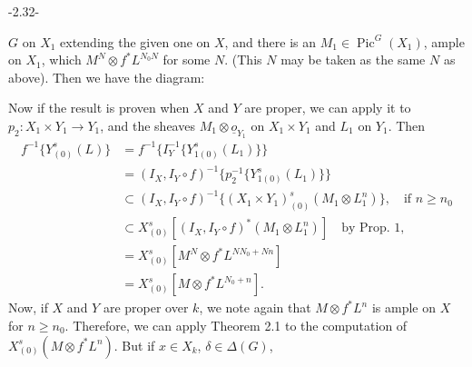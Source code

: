 \begin{center}-2.32-\end{center}
$G$ on $X_1$ extending the given one on $X$, and there is an $M_1\in\operatorname{Pic}^G(X_1)$,
ample on $X_1$, which  $M^N\otimes f^*L^{N_0N}$ for some $N$. (This $N$ may be taken
as the same $N$ as above). Then we have the diagram:

Now if the result is proven when $X$ and $Y$ are proper, we can
apply it to $p_2:X_1\times Y_1\longrightarrow Y_1$, and the sheaves $M_1\otimes\underline{o}_{Y_1}$ on $X_1\times Y_1$
and $L_1$ on $Y_1$. Then
\[
\begin{aligned}
f^{-1}\{Y^s_{(0)}(L)\}&=f^{-1}\{I_Y^{-1}\{Y^s_{1(0)}(L_1)\}\}\\
&=(I_X,I_Y\circ f)^{-1}\{p_2^{-1}\{Y^s_{1(0)}(L_1)\}\}\\
&\subset (I_X,I_Y\circ f)^{-1}\{(X_1\times Y_1)^s_{(0)}(M_1\otimes L_1^n)\},\quad\text{if }n\geq n_0\\
&\subset X^s_{(0)}\left[(I_X,I_Y\circ f)^*(M_1\otimes L_1^n)\right]\quad\text{by Prop. 1},\\
&=X^s_{(0)}\left[M^N\otimes f^*L^{NN_0+Nn}\right]\\
&=X^s_{(0)}\left[M\otimes f^*L^{N_0+n}\right].
\end{aligned}
\]
Now, if $X$ and $Y$ are proper over $k$, we note again that
$M\otimes f^*L^n$ is ample on $X$ for $n\geq n_0$. Therefore, we can apply Theorem
2.1 to the computation of $X^s_{(0)}(M\otimes f^*L^n)$. But if $x\in X_k$, $\delta\in\Delta(G)$,
